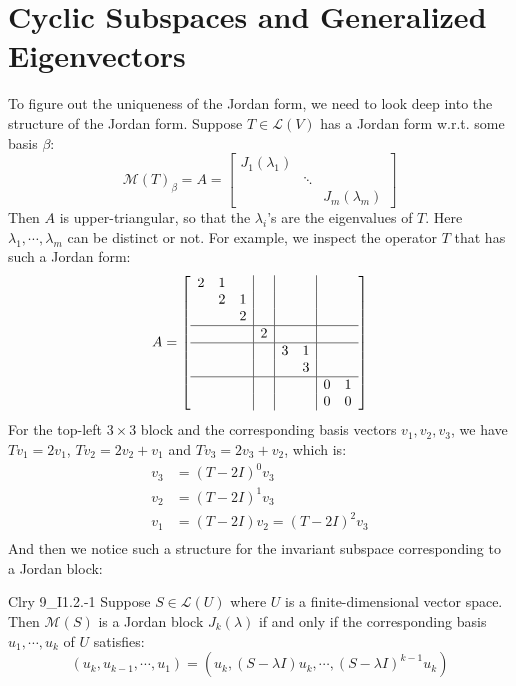 \documentclass{article}
\begin{document}
\section{Cyclic Subspaces and Generalized Eigenvectors}
To figure out the uniqueness of the Jordan form, we need to look deep into the structure of the Jordan form. Suppose $T\in\mathcal{L}(V)$ has a Jordan form w.r.t. some basis $\beta$:
$$ \mathcal{M}(T)_\beta = A = 
\begin{bmatrix}
    J_1(\lambda_1) & & \\
    & \ddots & \\
    & & J_m(\lambda_m)
\end{bmatrix}
$$
Then $A$ is upper-triangular, so that the $\lambda_i$'s are the eigenvalues of $T$. Here $\lambda_1, \cdots, \lambda_m$ can be distinct or not. For example, we inspect the operator $T$ that has such a Jordan form:
$$ A =
\left[\begin{array}{ccc|c|cc|cc}
    2&1& & & & & & \\
     &2&1& & & & & \\
     & &2& & & & & \\
    \hline
     & & &2& & & & \\
    \hline
     & & & &3&1& & \\
     & & & & &3& & \\
    \hline
     & & & & & &0&1\\
     & & & & & &0&0
\end{array}\right]
$$
For the top-left $3\times 3$ block and the corresponding basis vectors $v_1, v_2, v_3$, we have $Tv_1 = 2v_1$, $Tv_2 = 2v_2+v_1$ and $Tv_3 = 2v_3+v_2$, which is:
$$
\begin{aligned}
    v_3 &= (T-2I)^0v_3 \\
    v_2 &= (T-2I)^1v_3 \\
    v_1 &= (T-2I)v_2 = (T-2I)^2v_3 \\
\end{aligned}
$$
And then we notice such a structure for the invariant subspace corresponding to a Jordan block:

\begin{Th}{Clry 9\_I1.2.-1}
    Suppose $S\in\mathcal{L}(U)$ where $U$ is a finite-dimensional vector space. Then $\mathcal{M}(S)$ is a Jordan block $J_k(\lambda)$ if and only if the corresponding basis ${u_1, \cdots, u_k}$ of $U$ satisfies:
    $$ (u_k, u_{k-1}, \cdots, u_1) = (u_k, (S-\lambda I)u_k, \cdots, (S-\lambda I)^{k-1}u_k) $$
\end{Th}
\end{document}
